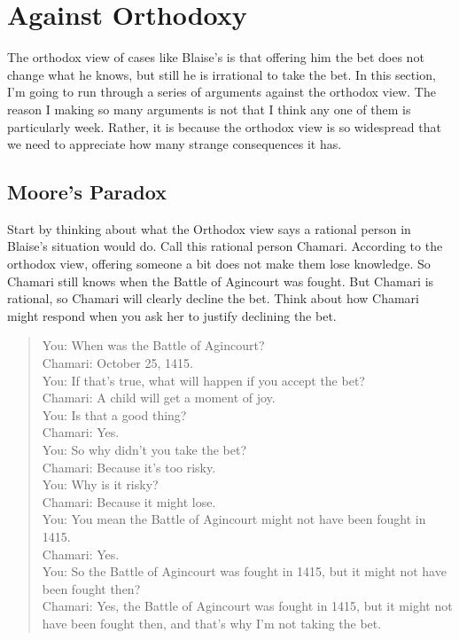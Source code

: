 \documentclass[
  11pt,
]{book}
\begin{document}
\hypertarget{orthodox}{%
\section{Against Orthodoxy}\label{orthodox}}

The orthodox view of cases like Blaise's is that offering him the bet does not change what he knows, but still he is irrational to take the bet. In this section, I'm going to run through a series of arguments against the orthodox view. The reason I making so many arguments is not that I think any one of them is particularly week. Rather, it is because the orthodox view is so widespread that we need to appreciate how many strange consequences it has.

\hypertarget{orthodoxmoore}{%
\subsection{Moore's Paradox}\label{orthodoxmoore}}

Start by thinking about what the Orthodox view says a rational person in Blaise's situation would do. Call this rational person Chamari. According to the orthodox view, offering someone a bit does not make them lose knowledge. So Chamari still knows when the Battle of Agincourt was fought. But Chamari is rational, so Chamari will clearly decline the bet. Think about how Chamari might respond when you ask her to justify declining the bet.

\begin{quote}
You: When was the Battle of Agincourt?\\
Chamari: October 25, 1415.\\
You: If that's true, what will happen if you accept the bet?\\
Chamari: A child will get a moment of joy.\\
You: Is that a good thing?\\
Chamari: Yes.\\
You: So why didn't you take the bet?\\
Chamari: Because it's too risky.\\
You: Why is it risky?\\
Chamari: Because it might lose.\\
You: You mean the Battle of Agincourt might not have been fought in 1415.\\
Chamari: Yes.\\
You: So the Battle of Agincourt was fought in 1415, but it might not have been fought then?\\
Chamari: Yes, the Battle of Agincourt was fought in 1415, but it might not have been fought then, and that's why I'm not taking the bet.
\end{quote}
\end{document}
